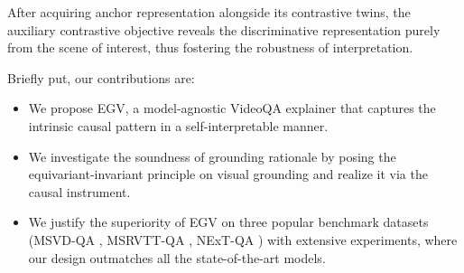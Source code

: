 
% 
After acquiring anchor representation alongside its contrastive twins, the auxiliary contrastive objective reveals the discriminative representation purely from the scene of interest, thus fostering the robustness of interpretation.

Briefly put, our contributions are: 
\begin{itemize}[leftmargin=*]
    \item We propose EGV, a model-agnostic VideoQA explainer that captures the intrinsic causal pattern in a self-interpretable manner.
    
    \item We investigate the soundness of grounding rationale by posing the equivariant-invariant principle on visual grounding and realize it via the causal instrument.
    
    \item We justify the superiority of EGV on three popular benchmark datasets (\ie MSVD-QA \cite{DBLP:conf/mm/XuZX0Z0Z17}, MSRVTT-QA \cite{DBLP:conf/mm/XuZX0Z0Z17},  NExT-QA \cite{DBLP:conf/cvpr/XiaoSYC21}) with extensive experiments, where our design outmatches all the state-of-the-art models.
\end{itemize}













